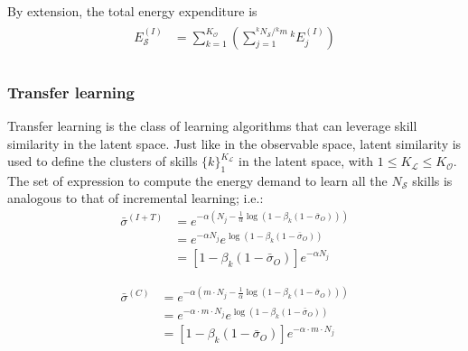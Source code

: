 
By extension, the total energy expenditure is
\begin{align}\label{eq:itl_total_energy}
\begin{split}
  E^{(I)}_{\mathcal{S}} &= \sum^{K_\mathcal{O}}_{k=1}  \left( {\sum^{{{^k}N_{\mathcal{S}}}/{{^k}m}}_{j=1} {^k}E^{(I)}_j} \right)
   \\
\end{split}
\end{align}


\subsubsection{Transfer learning}
Transfer learning is the class of learning algorithms that can leverage skill similarity in the latent space. Just like in the observable space, latent similarity is used to define the clusters of skills $\lbrace k \rbrace^{K_\mathcal{L}}_1 $ in the latent space, with $1 \leq K_\mathcal{L} \leq K_\mathcal{O}$. The set of expression to compute the energy demand to learn all the $N_\mathcal{S}$ skills is analogous to that of incremental learning; i.e.:
\begin{align}
    \bar{\sigma}^{(I+T)} &= e^{-\alpha \left(N_j - \frac{1}{\alpha}  \log\left( 1- \beta_k(1 - \bar{\sigma}_O) \right) \right)}\\
         &= e^{-\alpha N_j}e^{  \log\left( 1-\beta_k(1 - \bar{\sigma}_O) \right) }\\
         &= \left[1-\beta_k \left( 1 - \bar{\sigma}_O \right)\right]e^{-\alpha N_j}
\end{align}


\begin{align}
    \bar{\sigma}^{(C)} &= e^{-\alpha  \left(m \cdot N_j - \frac{1}{\alpha}  \log\left( 1- \beta_k(1 - \bar{\sigma}_O) \right) \right)}\\
         &= e^{-\alpha  \cdot m \cdot N_j}e^{  \log\left( 1-\beta_k(1 - \bar{\sigma}_O) \right) }\\
         &= \left[1-\beta_k \left( 1 - \bar{\sigma}_O \right)\right]e^{-\alpha \cdot m\cdot N_j}
\end{align}




